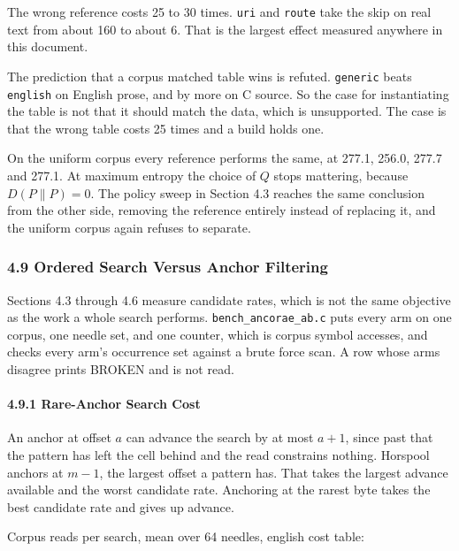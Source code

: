 The wrong reference costs 25 to 30 times. \texttt{uri} and \texttt{route} take the skip on real text from about 160 to about 6. That is the largest effect measured anywhere in this document.

The prediction that a corpus matched table wins is refuted. \texttt{generic} beats \texttt{english} on English prose, and by more on C source. So the case for instantiating the table is not that it should match the data, which is unsupported. The case is that the wrong table costs 25 times and a build holds one.

On the uniform corpus every reference performs the same, at 277.1, 256.0, 277.7 and 277.1. At maximum entropy the choice of \(Q\) stops mattering, because \(D(P\|P) = 0\). The policy sweep in Section 4.3 reaches the same conclusion from the other side, removing the reference entirely instead of replacing it, and the uniform corpus again refuses to separate.

\subsubsection{4.9 Ordered Search Versus Anchor Filtering}

Sections 4.3 through 4.6 measure candidate rates, which is not the same objective as the work a whole search performs. \texttt{bench\_\allowbreak{}ancorae\_\allowbreak{}ab.\allowbreak{}c} puts every arm on one corpus, one needle set, and one counter, which is corpus symbol accesses, and checks every arm's occurrence set against a brute force scan. A row whose arms disagree prints BROKEN and is not read.

\paragraph{4.9.1 Rare-Anchor Search Cost}

An anchor at offset \(a\) can advance the search by at most \(a+1\), since past that the pattern has left the cell behind and the read constrains nothing. Horspool anchors at \(m-1\), the largest offset a pattern has. That takes the largest advance available and the worst candidate rate. Anchoring at the rarest byte takes the best candidate rate and gives up advance.

Corpus reads per search, mean over 64 needles, english cost table:

